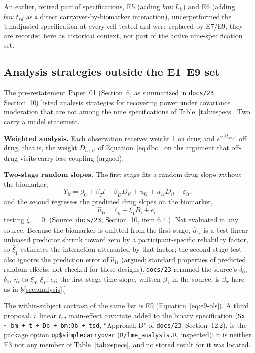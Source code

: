 \documentclass[11pt]{article}
\newcommand{\note}[1]{\textcolor{blue!60!black}{\small [#1]}}
\newcommand{\code}[1]{\texttt{#1}}
\begin{document}
An earlier, retired pair of specifications, E5 (adding
$bm{:}L_{it}$) and E6 (adding $bm{:}t_{sd}$ as a direct
carryover-by-biomarker interaction), underperformed the Unadjusted
specification at every cell tested and were replaced by E7/E9; they
are recorded here as historical context, not part of the active
nine-specification set.

\subsection{Analysis strategies outside the E1--E9 set}
\label{sec:inva-altanalysis}

The pre-restatement Paper~01 (Section~6, as summarized in
\code{docs/23}, Section~10) listed analysis strategies for recovering
power under covariance moderation that are not among the nine
specifications of Table~\ref{tab:especs}. Two carry a model statement.

\textbf{Weighted analysis.} Each observation receives weight 1 on drug
and $e^{-\lambda t_{sd,it}}$ off drug, that is, the weight
$D_{bc,it}$ of Equation~\eqref{eq:dbc}, on the argument that off-drug
visits carry less coupling (argued).

\textbf{Two-stage random slopes.} The first stage fits a random drug
slope without the biomarker,
\begin{equation}
Y_{it} = \beta_0 + \beta_T t + \beta_D D_{it} + u_{0i} + u_{1i}D_{it}
  + \varepsilon_{it},
\label{eq:inva-twostage-1}
\end{equation}
and the second regresses the predicted drug slopes on the biomarker,
\begin{equation}
\hat u_{1i} = \xi_0 + \xi_1 B_i + e_i,
\label{eq:inva-twostage-2}
\end{equation}
testing $\xi_1 = 0$. (Source: \code{docs/23}, Section~10, item 6.4.)
\note{Not evaluated in any source. Because the biomarker is omitted
from the first stage, $\hat u_{1i}$ is a best linear unbiased predictor
shrunk toward zero by a participant-specific reliability factor, so
$\hat\xi_1$ estimates the interaction attenuated by that factor; the
second-stage test also ignores the prediction error of $\hat u_{1i}$
(argued; standard properties of predicted random effects, not checked
for these designs). \code{docs/23} renamed the source's $\delta_0$,
$\delta_1$, $\eta_i$ to $\xi_0$, $\xi_1$, $e_i$; the first-stage time
slope, written $\beta_1$ in the source, is $\beta_T$ here as in
\S\ref{sec:analysis}.}

The within-subject contrast of the same list is E9
(Equation~\eqref{eq:e9-ols}). A third proposal, a linear
$t_{sd}$ main-effect covariate added to the binary specification
(\code{Sx \textasciitilde\ bm + t + Db + bm:Db + tsd}, ``Approach B''
of \code{docs/23}, Section~12.2), is the package option
\code{op\$simplecarryover} (\code{R/lme\_analysis.R}, inspected); it is
neither E3 nor any member of Table~\ref{tab:especs}, and no stored
result for it was located.
\end{document}
